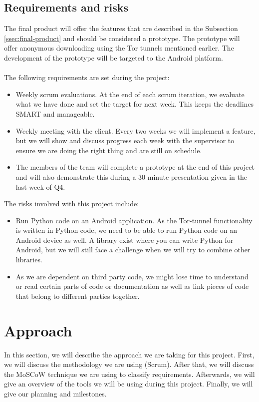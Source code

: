 \subsection{Requirements and risks}
The final product will offer the features that are described in the Subsection \ref{ssec:final-product} and should be considered a prototype. The prototype will offer anonymous downloading using the Tor tunnels mentioned earlier. The development of the prototype will be targeted to the Android platform.\\\\
The following requirements are set during the project:

\begin{itemize}
\item Weekly scrum evaluations. At the end of each scrum iteration, we evaluate what we have done and set the target for next week. This keeps the deadlines SMART and manageable.
\item Weekly meeting with the client. Every two weeks we will implement a feature, but we will show and discuss progress each week with the supervisor to ensure we are doing the right thing and are still on schedule.
\item The members of the team will complete a prototype at the end of this project and will also demonstrate this during a 30 minute presentation given in the last week of Q4.
\end{itemize}

The risks involved with this project include:
\begin{itemize}
\item Run Python code on an Android application. As the Tor-tunnel functionality is written in Python code, we need to be able to run Python code on an Android device as well. A library exist where you can write Python for Android, but we will still face a challenge when we will try to combine other libraries.
\item As we are dependent on third party code, we might lose time to understand or read certain parts of code or documentation as well as link pieces of code that belong to different parties together.
\end{itemize}



\section{Approach}
In this section, we will describe the approach we are taking for this project. First, we will discuss the methodology we are using (Scrum). After that, we will discuss the MoSCoW technique we are using to classify requirements. Afterwards, we will give an overview of the tools we will be using during this project. Finally, we will give our planning and milestones.

